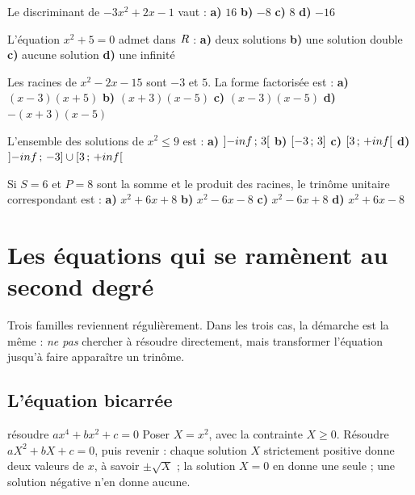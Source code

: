 \begin{qcm}
\exo Le discriminant de $-3x^{2}+2x-1$ vaut :
\textbf{a)} $16$ \quad \textbf{b)} $-8$ \quad \textbf{c)} $8$ \quad
\textbf{d)} $-16$ 

\exo L'équation $x^{2}+5 = 0$ admet dans $R$ :
\textbf{a)} deux solutions \quad \textbf{b)} une solution double \quad
\textbf{c)} aucune solution \quad \textbf{d)} une infinité 

\exo Les racines de $x^{2}-2x-15$ sont $-3$ et $5$. La forme factorisée est :
\textbf{a)} $(x-3)(x+5)$ \quad \textbf{b)} $(x+3)(x-5)$ \quad
\textbf{c)} $(x-3)(x-5)$ \quad \textbf{d)} $-(x+3)(x-5)$ 

\exo L'ensemble des solutions de $x^{2} \leq 9$ est :
\textbf{a)} $\left]-inf\,;\,3\right[$ \quad \textbf{b)} $\left[-3\,;\,3\right]$
\quad \textbf{c)} $\left[3\,;\,+inf\right[$ \quad
\textbf{d)} $\left]-inf\,;\,-3\right]\cup\left[3\,;\,+inf\right[$

\exo Si $S = 6$ et $P = 8$ sont la somme et le produit des racines, le
trinôme unitaire correspondant est :
\textbf{a)} $x^{2}+6x+8$ \quad \textbf{b)} $x^{2}-6x-8$ \quad
\textbf{c)} $x^{2}-6x+8$ \quad \textbf{d)} $x^{2}+6x-8$ 
\end{qcm}

\section{Les équations qui se ramènent au second degré}

Trois familles reviennent régulièrement. Dans les trois cas, la démarche est
la même : \emph{ne pas} chercher à résoudre directement, mais transformer
l'équation jusqu'à faire apparaître un trinôme.

\subsection{L'équation bicarrée}

\begin{methode}{résoudre $ax^{4}+bx^{2}+c = 0$}
Poser $X = x^{2}$, avec la contrainte $X \geq 0$. Résoudre $aX^{2}+bX+c = 0$,
puis revenir : chaque solution $X$ strictement positive donne deux valeurs de
$x$, à savoir $\pm\sqrt X$ ; la solution $X = 0$ en donne une seule ; une
solution négative n'en donne aucune.
\end{methode}

